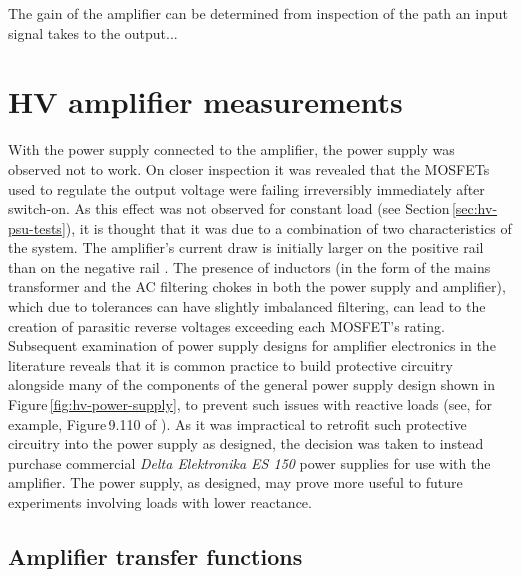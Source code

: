 
The gain of the amplifier can be determined from inspection of the path an input signal takes to the output... 

\section{\label{sec:hv-amp-measurements}HV amplifier measurements}

With the power supply connected to the amplifier, the power supply was observed not to work. On closer inspection it was revealed that the \glspl{MOSFET} used to regulate the output voltage were failing irreversibly immediately after switch-on. As this effect was not observed for constant load (see Section\,\ref{sec:hv-psu-tests}), it is thought that it was due to a combination of two characteristics of the system. The amplifier's current draw is initially larger on the positive rail than on the negative rail . The presence of inductors (in the form of the mains transformer and the \gls{AC} filtering chokes in both the power supply and amplifier), which due to tolerances can have slightly imbalanced filtering, can lead to the creation of parasitic reverse voltages exceeding each \gls{MOSFET}'s rating. Subsequent examination of power supply designs for amplifier electronics in the literature reveals that it is common practice to build protective circuitry alongside many of the components of the general power supply design shown in Figure\,\ref{fig:hv-power-supply}, to prevent such issues with reactive loads (see, for example, Figure\,9.110 of \cite{Horowitz2015}). As it was impractical to retrofit such protective circuitry into the power supply as designed, the decision was taken to instead purchase commercial \emph{Delta Elektronika ES 150} power supplies for use with the amplifier. The power supply, as designed, may prove more useful to future experiments involving loads with lower reactance.

\subsection{Amplifier transfer functions}

